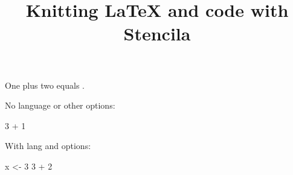 \documentclass{article}
\begin{document}
\title{Knitting LaTeX and code with Stencila}

One plus two equals .

No language or other options:

\begin{chunk}
3 + 1
\end{chunk}

With lang and options:

\begin{chunk}
x <- 3
3 + 2
\end{chunk}
\end{document}

